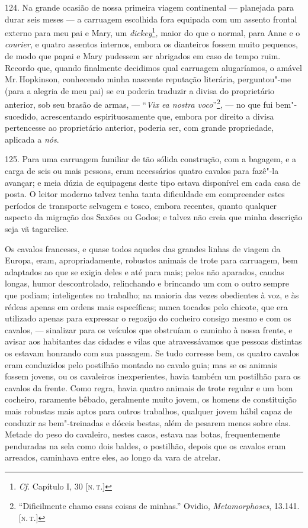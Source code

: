 124. Na grande ocasião de nossa primeira viagem continental --- planejada
para durar seis meses --- a carruagem escolhida fora equipada com um
assento frontal externo para meu pai e Mary, um \emph{dickey}\footnote{\emph{Cf}.
  Capítulo I, 30 {[}\textsc{n.\,t.}{]}}\emph{,} maior do que o normal, para
Anne e o \emph{courier}, e quatro assentos internos, embora os
dianteiros fossem muito pequenos, de modo que papai e Mary pudessem ser
abrigados em caso de tempo ruim. Recordo que, quando finalmente
decidimos qual carruagem alugaríamos, o amável Mr.\,Hopkinson, conhecendo
minha nascente reputação literária, perguntou"-me (para a alegria de meu
pai) se eu poderia traduzir a divisa do proprietário anterior, sob seu
brasão de armas, --- ``\emph{Vix ea nostra voco}''\footnote{``Dificilmente
  chamo essas coisas de minhas.'' Ovidio, \emph{Metamorphoses}, 13.141.
  {[}\textsc{n.\,t.}{]}}, --- no que fui bem"-sucedido, acrescentando
espirituosamente que, embora por direito a divisa pertencesse ao
proprietário anterior, poderia ser, com grande propriedade, aplicada a
\emph{nós}.

125. Para uma carruagem familiar de tão sólida construção, com a
bagagem, e a carga de seis ou mais pessoas, eram necessários quatro
cavalos para fazê"-la avançar; e meia dúzia de equipagens deste tipo
estava disponível em cada casa de posta. O leitor moderno talvez tenha
tanta dificuldade em compreender estes períodos de transporte selvagem e
tosco, embora recentes, quanto qualquer aspecto da migração dos Saxões
ou Godos; e talvez não creia que minha descrição seja vã tagarelice.

Os cavalos franceses, e quase todos aqueles das grandes linhas de viagem
da Europa, eram, apropriadamente, robustos animais de trote para
carruagem, bem adaptados ao que se exigia deles e até para mais; pelos
não aparados, caudas longas, humor descontrolado, relinchando e
brincando um com o outro sempre que podiam; inteligentes no trabalho; na
maioria das vezes obedientes à voz, e às rédeas apenas em ordens mais
específicas; nunca tocados pelo chicote, que era utilizado apenas para
expressar o regozijo do cocheiro consigo mesmo e com os cavalos, ---
sinalizar para os veículos que obstruíam o caminho à nossa frente, e
avisar aos habitantes das cidades e vilas que atravessávamos que pessoas
distintas os estavam honrando com sua passagem. Se tudo corresse bem, os
quatro cavalos eram conduzidos pelo postilhão montado no cavalo guia;
mas se os animais fossem jovens, ou os cavaleiros inexperientes, havia
também um postilhão para os cavalos da frente. Como regra, havia quatro
animais de trote regular e um bom cocheiro, raramente bêbado, geralmente
muito jovem, os homens de constituição mais robustas mais aptos para
outros trabalhos, qualquer jovem hábil capaz de conduzir as
bem"-treinadas e dóceis bestas, além de pesarem menos sobre elas. Metade
do peso do cavaleiro, nestes casos, estava nas botas, frequentemente
penduradas na sela como dois baldes, o postilhão, depois que os cavalos
eram arreados, caminhava entre eles, ao longo da vara de atrelar.

